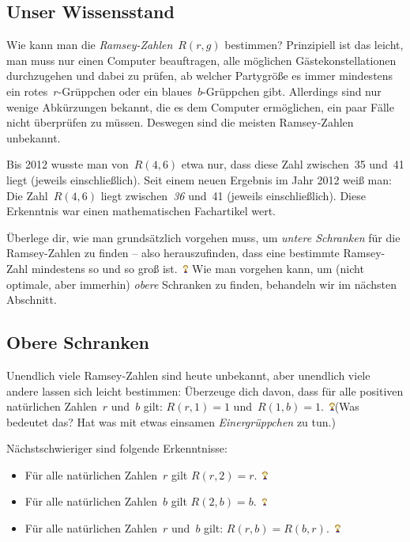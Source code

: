 \documentclass{../../zirkelblatt1718}
\theoremstyle{definition}
\theoremstyle{plain}
\theoremstyle{remark}
\newcommand{\happy}{\includegraphics[height=0.7em]{happy}\xspace}
\begin{document}
\subsection{Unser Wissensstand}

Wie kann man die \emph{Ramsey-Zahlen}~$R(r,g)$ bestimmen? Prinzipiell ist das
leicht, man muss nur einen Computer beauftragen, alle möglichen
Gästekonstellationen durchzugehen und dabei zu prüfen, ab welcher Partygröße es
immer mindestens ein rotes~$r$-Grüppchen oder ein blaues~$b$-Grüppchen gibt.
Allerdings sind nur wenige Abkürzungen bekannt, die es dem Computer
ermöglichen, ein paar Fälle nicht überprüfen zu müssen. Deswegen sind die
meisten Ramsey-Zahlen unbekannt.

Bis 2012 wusste man von~$R(4,6)$ etwa nur, dass diese Zahl zwischen~35 und~41
liegt (jeweils einschließlich). Seit einem neuen Ergebnis im Jahr 2012 weiß
man: Die Zahl~$R(4,6)$ liegt zwischen~\emph{36} und~41 (jeweils
einschließlich). Diese Erkenntnis war einen mathematischen Fachartikel wert.

Überlege dir, wie man grundsätzlich vorgehen muss, um \emph{untere Schranken}
für die Ramsey-Zahlen zu finden -- also herauszufinden, dass eine bestimmte
Ramsey-Zahl mindestens so und so groß ist.~\happy Wie man vorgehen kann, um
(nicht optimale, aber immerhin) \emph{obere} Schranken zu finden, behandeln wir
im nächsten Abschnitt.


\subsection{Obere Schranken}

Unendlich viele Ramsey-Zahlen sind heute unbekannt, aber unendlich viele andere
lassen sich leicht bestimmen: Überzeuge dich davon, dass für alle positiven
natürlichen Zahlen~$r$ und~$b$ gilt: $R(r,1) = 1$ und~$R(1,b) = 1$.~\happy (Was
bedeutet das? Hat was mit etwas einsamen \emph{Einergrüppchen} zu tun.)

Nächstschwieriger sind folgende Erkenntnisse:

\begin{itemize}
\item Für alle natürlichen Zahlen~$r$ gilt $R(r,2) = r$.~\happy
\item Für alle natürlichen Zahlen~$b$ gilt $R(2,b) = b$.~\happy
\item Für alle natürlichen Zahlen~$r$ und~$b$ gilt: $R(r,b) = R(b,r)$.~\happy
\end{itemize}
\end{document}
